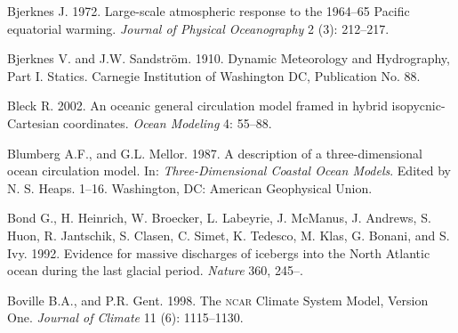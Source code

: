 \begin{thebibliography}{999}
Bjerknes J.  1972. Large-scale atmospheric response to the 1964--65
Pacific equatorial warming. \textit{Journal of Physical Oceanography}
2 (3): 212--217.
%

Bjerknes V. and J.W. Sandstr\"{o}m. 1910. Dynamic Meteorology and
Hydrography, Part I. Statics. Carnegie Institution of Washington DC,
Publication No. 88.
%

Bleck R.  2002. An oceanic general circulation model framed in hybrid
isopycnic-Cartesian coordinates. \textit{Ocean Modeling} 4: 55--88.
%

Blumberg A.F., and G.L. Mellor.  1987. A description of a
three-dimensional ocean circulation model. In:
\textit{Three-Dimensional Coastal Ocean Models}. Edited by
N. S. Heaps. 1--16. Washington, DC: American Geophysical Union.
%

Bond G., H. Heinrich, W. Broecker, L. Labeyrie, J. McManus,
J. Andrews, S. Huon, R. Jantschik, S. Clasen, C. Simet, K. Tedesco,
M. Klas, G. Bonani, and S. Ivy. 1992. Evidence for massive discharges
of icebergs into the North Atlantic ocean during the last glacial
period. \textit{Nature} 360, 245--.
%

Boville B.A., and P.R. Gent.  1998. The \textsc{ncar} Climate System
Model, Version One. \textit{Journal of Climate} 11 (6): 1115--1130.
%


\end{thebibliography}
